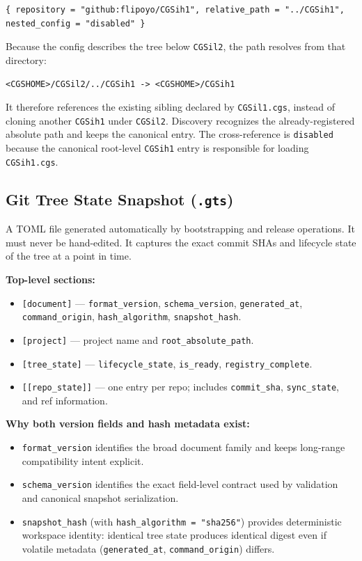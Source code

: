 \begin{lstlisting}
{ repository = "github:flipoyo/CGSih1", relative_path = "../CGSih1", nested_config = "disabled" }
\end{lstlisting}

Because the config describes the tree below \texttt{CGSil2}, the path resolves
from that directory:

\begin{center}
\texttt{<CGSHOME>/CGSil2/../CGSih1 -> <CGSHOME>/CGSih1}
\end{center}

It therefore references the existing sibling declared by \texttt{CGSil1.cgs},
instead of cloning another \texttt{CGSih1} under \texttt{CGSil2}. Discovery
recognizes the already-registered absolute path and keeps the canonical entry.
The cross-reference is \texttt{disabled} because the canonical root-level
\texttt{CGSih1} entry is responsible for loading \texttt{CGSih1.cgs}.

\subsection{Git Tree State Snapshot (\texttt{.gts})}

A TOML file generated automatically by bootstrapping and release operations.
It must never be hand-edited. It captures the exact commit SHAs and lifecycle
state of the tree at a point in time.

\textbf{Top-level sections:}
\begin{itemize}
  \item \texttt{[document]} — \texttt{format\_version}, \texttt{schema\_version},
        \texttt{generated\_at}, \texttt{command\_origin},
        \texttt{hash\_algorithm}, \texttt{snapshot\_hash}.
  \item \texttt{[project]} — project name and \texttt{root\_absolute\_path}.
  \item \texttt{[tree\_state]} — \texttt{lifecycle\_state}, \texttt{is\_ready},
        \texttt{registry\_complete}.
  \item \texttt{[[repo\_state]]} — one entry per repo; includes
        \texttt{commit\_sha}, \texttt{sync\_state}, and ref information.
\end{itemize}

\textbf{Why both version fields and hash metadata exist:}
\begin{itemize}
  \item \texttt{format\_version} identifies the broad document family and keeps
        long-range compatibility intent explicit.
  \item \texttt{schema\_version} identifies the exact field-level contract used
        by validation and canonical snapshot serialization.
  \item \texttt{snapshot\_hash} (with \texttt{hash\_algorithm = "sha256"})
        provides deterministic workspace identity: identical tree state produces
        identical digest even if volatile metadata (\texttt{generated\_at},
        \texttt{command\_origin}) differs.
\end{itemize}

